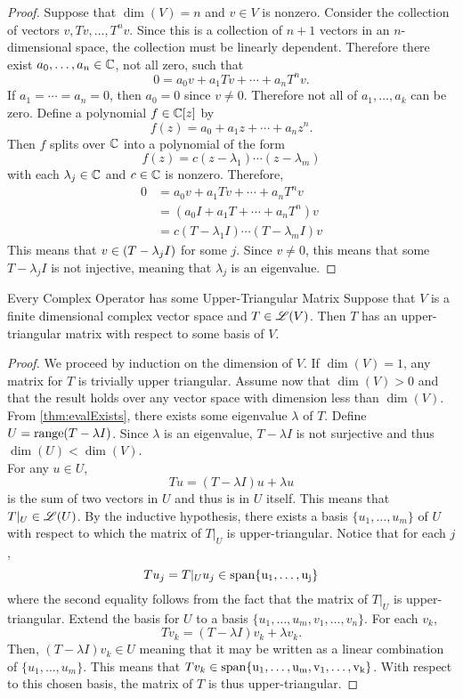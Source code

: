 \documentclass[../AlgebraQualSolutions.tex]{subfiles}
\begin{document}
\begin{proof}
    Suppose that $\dim(V) = n$ and $v \in V$ is nonzero. Consider the collection of vectors $v, Tv, \ldots, T^nv$. Since this is a collection of $n + 1$ vectors in an $n$-dimensional space, the collection must be linearly dependent. Therefore there exist $a_0,\ldots, a_n \in \mathbb{C}$, not all zero, such that
        \[0 = a_0 v + a_1Tv + \cdots + a_n T^n v.\]
    If $a_1 = \cdots = a_n = 0$, then $a_0 = 0$ since $v \neq 0$. Therefore not all of $a_1,\ldots, a_k$ can be zero. Define a polynomial $f \in \mathbb{C}[z]$ by
        \[f(z) = a_0 + a_1z + \cdots + a_nz^n. \]
    Then $f$ splits over $\mathbb{C}$ into a polynomial of the form
        \[f(z) = c(z- \lambda_1)\cdots (z - \lambda_m) \]
    with each $\lambda_j \in \mathbb{C}$ and $c \in \mathbb{C}$ is nonzero. Therefore,
        \begin{align*}
            0 &= a_0 v + a_1Tv + \cdots + a_n T^n v\\
            &= (a_0I + a_1T + \cdots + a_nT^n)v\\
            &= c(T- \lambda_1I)\cdots (T - \lambda_mI)v
        \end{align*}
    This means that $v \in \null(T - \lambda_j I)$ for some $j$. Since $v \neq 0$, this means that some $T - \lambda_j I$ is not injective, meaning that $\lambda_j$ is an eigenvalue.
\end{proof}

\begin{prop}{Every Complex Operator has some Upper-Triangular Matrix}{}
    Suppose that $V$ is a finite dimensional complex vector space and $T \in \mathscr{L}(V)$. Then $T$ has an upper-triangular matrix with respect to some basis of $V$.
\end{prop}

\begin{proof}
    We proceed by induction on the dimension of $V$. If $\dim(V) = 1$, any matrix for $T$ is trivially upper triangular. Assume now that $\dim(V) > 0$ and that the result holds over any vector space with dimension less than $\dim(V)$. From \ref{thm:evalExists}, there exists some eigenvalue $\lambda$ of $T$. Define $U = \mathrm{range}(T - \lambda I)$. Since $\lambda$ is an eigenvalue, $T - \lambda I$ is not surjective and thus $\dim(U) < \dim(V)$.\\

    For any $u \in U$,
        \[Tu = (T - \lambda I)u + \lambda u\]
    is the sum of two vectors in $U$ and thus is in $U$ itself. This means that $T|_U \in \mathscr{L}(U)$. By the inductive hypothesis, there exists a basis $\{u_1,\ldots,u_m\}$ of $U$ with respect to which the matrix of $T|_U$ is upper-triangular. Notice that for each $j$,
        \[Tu_j = T|_Uu_j \in \rm{span}\{u_1,\ldots,u_j\}\]
    where the second equality follows from the fact that the matrix of $T|_U$ is upper-triangular. Extend the basis for $U$ to a basis $\{u_1,\ldots,u_m,v_1,\ldots,v_n\}$. For each $v_k$,
        \[Tv_k = (T -\lambda I)v_k + \lambda v_k.\]
    Then, $(T -\lambda I)v_k \in U$ meaning that it may be written as a linear combination of $\{u_1,\ldots, u_m\}$. This means that $Tv_k \in \rm{span}\{u_1,\ldots,u_m,v_1,\ldots, v_k\}$. With respect to this chosen basis, the  matrix of $T$ is thus upper-triangular.
\end{proof}
\end{document}
